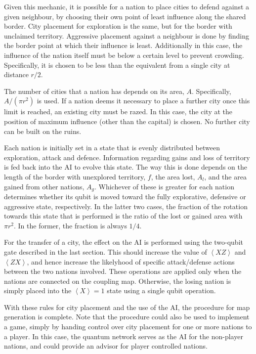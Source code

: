 \documentclass[conference]{IEEEtran}
\begin{document}
Given this mechanic, it is possible for a nation to place cities to defend against a given neighbour, by choosing their own point of least influence along the shared border. City placement for exploration is the same, but for the border with unclaimed territory. Aggressive placement against a neighbour is done by finding the border point at which their influence is least. Additionally in this case, the influence of the nation itself must be below a certain level to prevent crowding. Specifically, it is chosen to be less than the equivalent from a single city at distance $r/2$.

The number of cities that a nation has depends on its area, $A$. Specifically, $A/(\pi r^2)$ is used. If a nation deems it necessary to place a further city once this limit is reached, an existing city must be razed. In this case, the city at the position of maximum influence (other than the capital) is chosen. No further city can be built on the ruins.

Each nation is initially set in a state that is evenly distributed between exploration, attack and defence. Information regarding gains and loss of territory is fed back into the AI to evolve this state. The way this is done depends on the length of the border with unexplored territory, $f$, the area lost, $A_{l}$, and the area gained from other nations, $A_{g}$. Whichever of these is greater for each nation determines whether its qubit is moved toward the fully explorative, defensive or aggressive state, respectively. In the latter two cases, the fraction of the rotation towards this state that is performed is the ratio of the lost or gained area with $\pi r^2$. In the former, the fraction is always $1/4$. 

For the transfer of a city, the effect on the AI is performed using the two-qubit gate described in the last section. This should increase the value of $\left\langle XZ\right\rangle$ and $\left\langle ZX\right\rangle$, and hence increase the likelyhood of specific attack/defense actions between the two nations involved. These operations are applied only when the nations are connected on the coupling map. Otherwise, the losing nation is simply placed into the $\left\langle X\right\rangle=1$ state using a single qubit operation.

With these rules for city placement and the use of the AI, the procedure for map generation is complete. Note that the procedure could also be used to implement a game, simply by handing control over city placement for one or more nations to a player. In this case, the quantum network serves as the AI for the non-player nations, and could provide an advisor for player controlled nations.
\end{document}
